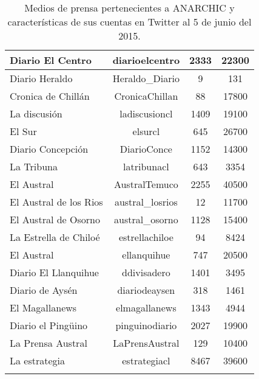\begin{center}
\begin{longtable}{| l | c | c | c |}
		Diario El Centro	&	diarioelcentro	&	2333	&	22300	\\ \hline
		Diario Heraldo	&	Heraldo\_Diario	&	9	&	131	\\ \hline
		Cronica de Chillán	&	CronicaChillan	&	88	&	17800	\\ \hline
		La discusión	&	ladiscusioncl	&	1409	&	19100	\\ \hline
		El Sur	&	elsurcl	&	645	&	26700	\\ \hline
		Diario Concepción	&	DiarioConce	&	1152	&	14300	\\ \hline
		La Tribuna	&	latribunacl	&	643	&	3354	\\ \hline
		El Austral	&	AustralTemuco	&	2255	&	40500	\\ \hline
		El Austral de los Rios	&	austral\_losrios	&	12	&	11700	\\ \hline
		El Austral de Osorno	&	austral\_osorno	&	1128	&	15400	\\ \hline
		La Estrella de Chiloé	&	estrellachiloe	&	94	&	8424	\\ \hline
		El Austral	&	ellanquihue	&	747	&	20500	\\ \hline
		Diario El Llanquihue	&	ddivisadero	&	1401	&	3495	\\ \hline
		Diario de Aysén	&	diariodeaysen	&	318	&	1461	\\ \hline
		El Magallanews	&	elmagallanews	&	1343	&	4944	\\ \hline
		Diario el Pingüino	&	pinguinodiario	&	2027	&	19900	\\ \hline
		La Prensa Austral	&	LaPrensAustral	&	129	&	10400	\\ \hline
		La estrategia & estrategiacl & 8467 & 39600 \\ \hline
		
		
		\caption {Medios de prensa pertenecientes a ANARCHIC y características de sus cuentas en Twitter al 5 de junio del 2015.}
	\end{longtable}
\end{center}